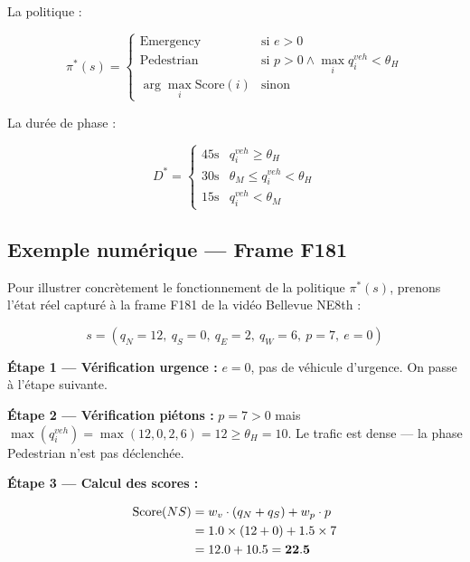 La politique :

\begin{equation}
\pi^*(s) =
\begin{cases}
\text{Emergency} &
\text{si } e > 0 \\[5pt]
\text{Pedestrian} &
\text{si } p > 0 \wedge
\max_i q_i^{veh} < \theta_H \\[5pt]
\arg\max_i \text{Score}(i) &
\text{sinon}
\end{cases}
\label{eq:policy_m5}
\end{equation}

La durée de phase :

\begin{equation}
D^* =
\begin{cases}
45\text{s} &
q_i^{veh} \geq \theta_H \\
30\text{s} &
\theta_M \leq q_i^{veh} < \theta_H \\
15\text{s} &
q_i^{veh} < \theta_M
\end{cases}
\label{eq:duration_m5}
\end{equation}


\subsection{Exemple numérique — Frame F181}

Pour illustrer concrètement le fonctionnement
de la politique $\pi^*(s)$, prenons l'état
réel capturé à la frame F181 de la vidéo
Bellevue NE8th :

\begin{equation}
s = (q_N=12,\ q_S=0,\ q_E=2,\ q_W=6,\
p=7,\ e=0)
\label{eq:exemple_etat}
\end{equation}

\textbf{Étape 1 — Vérification urgence :}
$e = 0$, pas de véhicule d'urgence.
On passe à l'étape suivante.

\textbf{Étape 2 — Vérification piétons :}
$p = 7 > 0$ mais $\max(q_i^{veh}) =
\max(12, 0, 2, 6) = 12 \geq \theta_H = 10$.
Le trafic est dense — la phase Pedestrian
n'est pas déclenchée.

\textbf{Étape 3 — Calcul des scores :}

\begin{align}
\text{Score}(NS) &= w_v \cdot (q_N + q_S)
+ w_p \cdot p \notag \\
&= 1.0 \times (12 + 0)
+ 1.5 \times 7 \notag \\
&= 12.0 + 10.5 = \mathbf{22.5}
\label{eq:score_ns_exemple}
\end{align}

